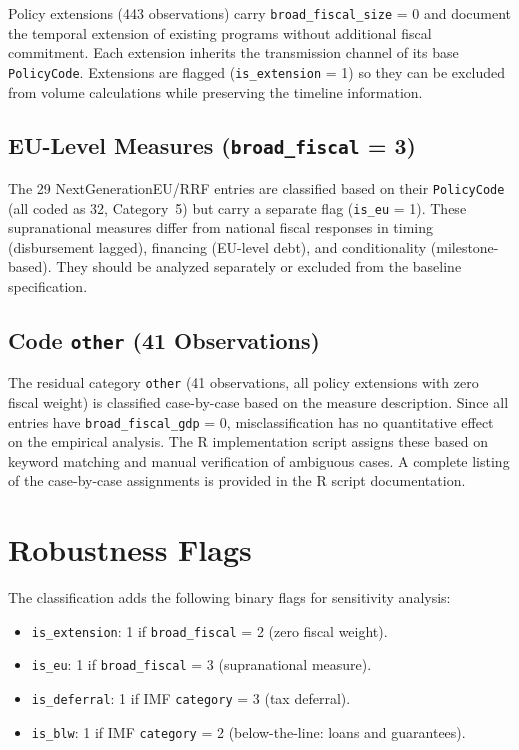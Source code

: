 \documentclass[12pt,a4paper]{article}
\begin{document}
Policy extensions (443 observations) carry \texttt{broad\_fiscal\_size} = 0 and
document the temporal extension of existing programs without additional fiscal
commitment. Each extension inherits the transmission channel of its base
\texttt{PolicyCode}. Extensions are flagged (\texttt{is\_extension} = 1) so they can
be excluded from volume calculations while preserving the timeline information.

\subsection{EU-Level Measures (\texttt{broad\_fiscal} = 3)}

The 29 NextGenerationEU/RRF entries are classified based on their
\texttt{PolicyCode} (all coded as 32, Category~5) but carry a separate flag
(\texttt{is\_eu} = 1). These supranational measures differ from national fiscal
responses in timing (disbursement lagged), financing (EU-level debt), and
conditionality (milestone-based). They should be analyzed separately or excluded
from the baseline specification.

\subsection{Code \texttt{other} (41 Observations)}
\label{sec:other}

The residual category \texttt{other} (41 observations, all policy extensions with
zero fiscal weight) is classified case-by-case based on the measure description.
Since all entries have \texttt{broad\_fiscal\_gdp} = 0, misclassification has no
quantitative effect on the empirical analysis. The R implementation script assigns
these based on keyword matching and manual verification of ambiguous cases. A
complete listing of the case-by-case assignments is provided in the R script
documentation.


\section{Robustness Flags}
\label{sec:flags}

The classification adds the following binary flags for sensitivity analysis:

\begin{itemize}[leftmargin=2em]
  \item \texttt{is\_extension}: 1 if \texttt{broad\_fiscal} = 2 (zero fiscal weight).
  \item \texttt{is\_eu}: 1 if \texttt{broad\_fiscal} = 3 (supranational measure).
  \item \texttt{is\_deferral}: 1 if IMF \texttt{category} = 3 (tax deferral).
  \item \texttt{is\_blw}: 1 if IMF \texttt{category} = 2 (below-the-line: loans and
    guarantees).
\end{itemize}
\end{document}
